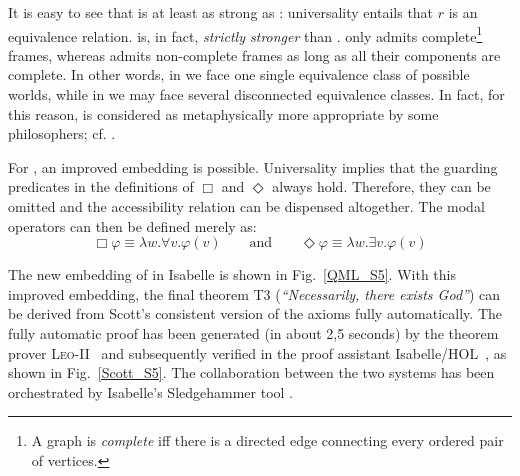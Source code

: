 \documentclass{article}
\newcommand{\Dia}{\Diamond} %
\newcommand{\BlackBox}{\blacksquare}
\newcommand{\BlackDia}{\Diamondblack}
\begin{document}
It is easy to see that \SFiveU is at least as strong as \SFive:
universality entails that $r$ is an equivalence relation. \SFiveU is,
in fact, \emph{strictly stronger} than \SFive. \SFiveU only admits
complete\footnote{A graph is \emph{complete} iff there is a directed
  edge connecting every ordered pair of vertices.} frames, whereas
\SFive admits non-complete frames as long as all their components are
complete. In other words, in \SFiveU we face one single equivalence
class of possible worlds, while in \SFive we may face several
disconnected equivalence classes. In fact, for this reason, \SFiveU is
considered as metaphysically more appropriate by some philosophers;
cf. \cite[p.~127]{williamson13}.

For \SFiveU, an improved embedding is possible. Universality implies
that the guarding predicates in the definitions of $\Box$ and
$\Diamond$ always hold. Therefore, they can be omitted and the
accessibility relation can be dispensed altogether. The modal
operators can then be defined merely as:
\[\Box \varphi \equiv \lambda w. \forall v.  \varphi(v) \qquad \text{and}
\qquad \Dia \varphi \equiv \lambda w.\exists v. \varphi(v)\]


The new embedding of \SFiveU in Isabelle is shown in Fig.~\ref{QML_S5}.
%
%
With this improved embedding, the final theorem T3
(\textit{``Necessarily, there exists God''}) can be derived from
Scott's consistent version of the axioms fully automatically.  The fully
automatic proof has been generated (in about 2,5 seconds) by the theorem prover
\textsc{Leo-II}~\cite{C26} and subsequently verified in the proof
assistant Isabelle/HOL~\cite{NPW02}, as shown in Fig.~\ref{Scott_S5}.
The collaboration between the two systems has been orchestrated by
Isabelle's Sledgehammer tool \cite{Sledgehammer}.
\end{document}
